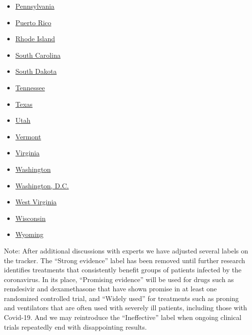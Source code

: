 \begin{itemize}
\item
  \href{https://www.nytimes.com/interactive/2020/us/pennsylvania-coronavirus-cases.html}{Pennsylvania}
\item
  \href{https://www.nytimes.com/interactive/2020/us/puerto-rico-coronavirus-cases.html}{Puerto
  Rico}
\item
  \href{https://www.nytimes.com/interactive/2020/us/rhode-island-coronavirus-cases.html}{Rhode
  Island}
\item
  \href{https://www.nytimes.com/interactive/2020/us/south-carolina-coronavirus-cases.html}{South
  Carolina}
\item
  \href{https://www.nytimes.com/interactive/2020/us/south-dakota-coronavirus-cases.html}{South
  Dakota}
\item
  \href{https://www.nytimes.com/interactive/2020/us/tennessee-coronavirus-cases.html}{Tennessee}
\item
  \href{https://www.nytimes.com/interactive/2020/us/texas-coronavirus-cases.html}{Texas}
\item
  \href{https://www.nytimes.com/interactive/2020/us/utah-coronavirus-cases.html}{Utah}
\item
  \href{https://www.nytimes.com/interactive/2020/us/vermont-coronavirus-cases.html}{Vermont}
\item
  \href{https://www.nytimes.com/interactive/2020/us/virginia-coronavirus-cases.html}{Virginia}
\item
  \href{https://www.nytimes.com/interactive/2020/us/washington-coronavirus-cases.html}{Washington}
\item
  \href{https://www.nytimes.com/interactive/2020/us/washington-dc-coronavirus-cases.html}{Washington,
  D.C.}
\item
  \href{https://www.nytimes.com/interactive/2020/us/west-virginia-coronavirus-cases.html}{West
  Virginia}
\item
  \href{https://www.nytimes.com/interactive/2020/us/wisconsin-coronavirus-cases.html}{Wisconsin}
\item
  \href{https://www.nytimes.com/interactive/2020/us/wyoming-coronavirus-cases.html}{Wyoming}
\end{itemize}

Note: After additional discussions with experts we have adjusted several
labels on the tracker. The ``Strong evidence'' label has been removed
until further research identifies treatments that consistently benefit
groups of patients infected by the coronavirus. In its place,
``Promising evidence'' will be used for drugs such as remdesivir and
dexamethasone that have shown promise in at least one randomized
controlled trial, and ``Widely used'' for treatments such as proning and
ventilators that are often used with severely ill patients, including
those with Covid-19. And we may reintroduce the ``Ineffective'' label
when ongoing clinical trials repeatedly end with disappointing results.

